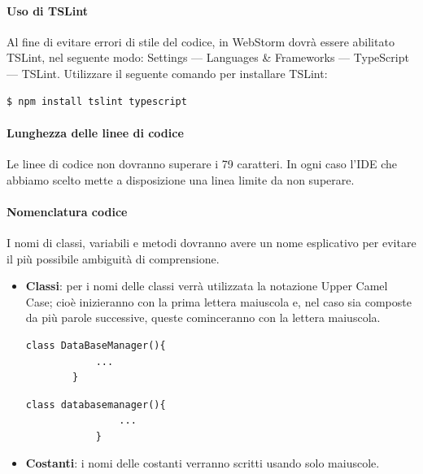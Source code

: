 \documentclass[11pt,a4paper]{article}
\begin{document}
{	\paragraph{Uso di TSLint}
	Al fine di evitare errori di stile del codice, in WebStorm dovrà essere abilitato TSLint, nel seguente modo: Settings — Languages \& Frameworks — TypeScript — TSLint. Utilizzare il seguente comando per installare TSLint:
	
	\begin{minipage}{.5\textwidth}
		\begin{lstlisting}[caption=Installazione di TSLint,numbers=none]
			$ npm install tslint typescript
		\end{lstlisting}
	\end{minipage}		
	
	\paragraph{Lunghezza delle linee di codice} Le linee di codice non dovranno superare i 79 caratteri. In ogni caso l'IDE che abbiamo scelto mette a disposizione una linea limite da non superare.
	
	\paragraph{Nomenclatura codice}
	I nomi di classi, variabili e metodi dovranno avere un nome esplicativo per evitare il più possibile ambiguità di comprensione.
	\begin{itemize}
		\item \textbf{Classi}: per i nomi delle classi verrà utilizzata la notazione Upper Camel Case; cioè inizieranno con la prima lettera maiuscola e, nel caso sia composte da più parole successive, queste cominceranno con la lettera maiuscola.
	
		\begin{multicols}{2}
			
			\begin{lstlisting}[caption=Esempio Corretto]
		class DataBaseManager(){
			...
		}
			\end{lstlisting}
			
			\begin{lstlisting}[caption=Esempio Scorretto]
			class databasemanager(){
				...
			}
			\end{lstlisting}
		\end{multicols}
		
		\item \textbf{Costanti}: i nomi delle costanti verranno scritti usando solo maiuscole.
		

\end{itemize}}
\end{document}
